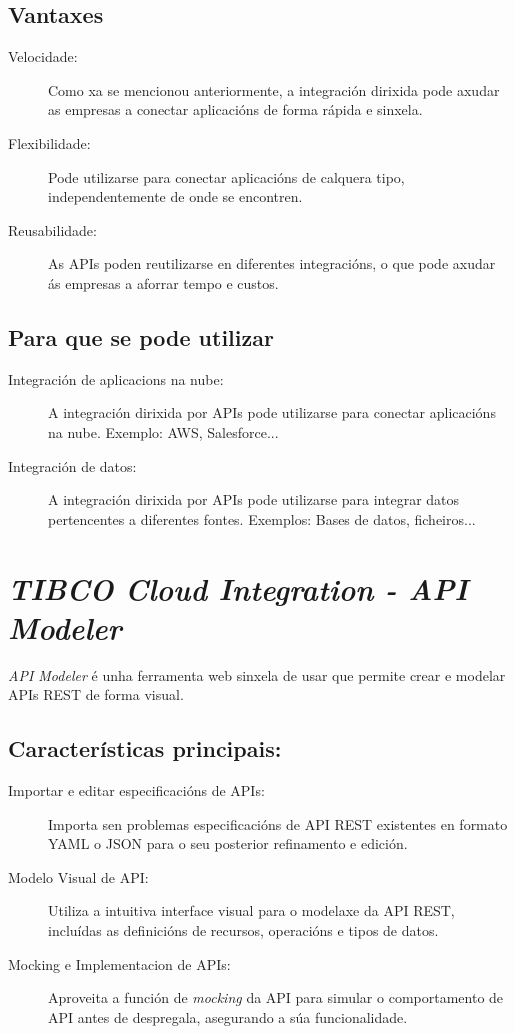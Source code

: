 \subsection{Vantaxes}

\begin{description}
    \item[Velocidade:] Como xa se mencionou anteriormente, a integración dirixida pode axudar as empresas a conectar aplicacións de forma rápida e sinxela.
    \item[Flexibilidade:] Pode utilizarse para conectar aplicacións de calquera tipo, independentemente de onde se encontren.
    \item[Reusabilidade:] As APIs poden reutilizarse en diferentes integracións, o que pode axudar ás empresas a aforrar tempo e custos. 
\end{description}

\subsection{Para que se pode utilizar}

\begin{description}
    \item[Integración de aplicacions na nube:] A integración dirixida por APIs pode utilizarse para conectar aplicacións na nube. Exemplo: AWS, Salesforce...
    
    \item[Integración de datos:] A integración dirixida por APIs pode utilizarse para integrar datos pertencentes a diferentes fontes. Exemplos: Bases de datos, ficheiros...
\end{description}

\section{\textit{TIBCO Cloud Integration - API Modeler}}

\textit{API Modeler} é unha ferramenta web sinxela de usar que permite crear e modelar APIs REST de forma visual.

\subsection{Características principais:}

\begin{description}
    \item[Importar e editar especificacións de APIs:] Importa sen problemas especificacións de API REST existentes en formato YAML o JSON para o seu posterior refinamento e edición.
    
    \item[Modelo Visual de API:] Utiliza a intuitiva interface visual para o modelaxe da API REST, incluídas as definicións de recursos, operacións e tipos de datos.
    
    \item[Mocking e Implementacion de APIs:] Aproveita a función de \textit{mocking} da API para simular o comportamento de API antes de despregala, asegurando a súa funcionalidade.
\end{description}

